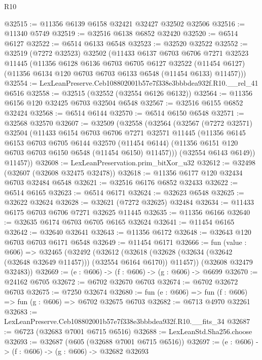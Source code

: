 \begin{lexlean}{R10}
\begin{coremodule}
@32515 := @11356 @6139 @6158 @32421 @32427 @32502 @32506
@32516 := @11340 @5749
@32519 := @32516 @6138 @6852 @32420
@32520 := @6514 @6127
@32522 := @6514 @6133 @6548
@32523 := @32520 @32522
@32552 := @32519
    (@7272 @32523)
    @32502
    (@11433
      @6137
      @6703
      @6706
      @7271
      @32523
      @11445
      (@11356
        @6128
        @6136
        @6703
        @6705
        @6127
        @32522
        (@11454 @6127)
        (@11356 @6134 @120 @6703 @6703 @6133 @6548 (@11454 @6133) @11457)))
@32554 := LexLeanPreserve.Ceb108802001b57e7f338e3bbbdea932f.R10.__rel_41 @6516
@32558 := @32515 (@32552 (@32554 @6126 @6132))
@32564 := @11356 @6156 @120 @32425 @6703 @32504 @6548
@32567 := @32516 @6155 @6852 @32424
@32568 := @6514 @6144
@32570 := @6514 @6150 @6548
@32571 := @32568 @32570
@32607 := @32509
    (@32558
      (@32564
        (@32567
          (@7272 @32571)
          @32504
          (@11433
            @6154
            @6703
            @6706
            @7271
            @32571
            @11445
            (@11356
              @6145
              @6153
              @6703
              @6705
              @6144
              @32570
              (@11454 @6144)
              (@11356 @6151 @120 @6703 @6703 @6150 @6548 (@11454 @6150) @11457)))
          (@32554 @6143 @6149))
        @11457))
@32608 := LexLeanPreservation.prim_bitXor_u32
@32612 := @32498 (@32607 (@32608 @32475 @32478))
@32618 := @11356 @6177 @120 @32434 @6703 @32484 @6548
@32621 := @32516 @6176 @6852 @32433
@32622 := @6514 @6165
@32623 := @6514 @6171
@32624 := @32623 @6548
@32625 := @32622 @32624
@32628 := @32621 (@7272 @32625) @32484
@32634 := @11433 @6175 @6703 @6706 @7271 @32625 @11445
@32635 := @11356 @6166
@32640 := @32635 @6174 @6703 @6705 @6165 @32624
@32641 := @11454 @6165
@32642 := @32640 @32641
@32643 := @11356 @6172
@32648 := @32643 @120 @6703 @6703 @6171 @6548
@32649 := @11454 @6171
@32666 := fun (value : @606) =>
  @32465
    (@32492
      (@32612
        (@32618 (@32628 (@32634 (@32642 (@32648 @32649 @11457))) (@32554 @6164 @6170)) @11457))
      (@32608 @32479 @32483))
@32669 := (e : @606) -> (f : @606) -> (g : @606) -> @6699
@32670 := @24162 @6705
@32672 := @6702 @32670 @6703
@32674 := @6702 @32672 @6703
@32675 := @7250 @32674
@32680 := fun (e : @606) => fun (f : @606) => fun (g : @606) => @6702 @32675 @6703
@32682 := @6713 @4970 @32261
@32683 := LexLeanPreserve.Ceb108802001b57e7f338e3bbbdea932f.R10.__fits_34
@32687 := @6723 (@32683 @7001 @6715 @6516)
@32688 := LexLeanStd.Sha256.choose
@32693 := @32687 (@605 (@32688 @7001 @6715 @6516))
@32697 := (e : @606) -> (f : @606) -> (g : @606) -> @32682 @32693

\end{coremodule}
\end{lexlean}

